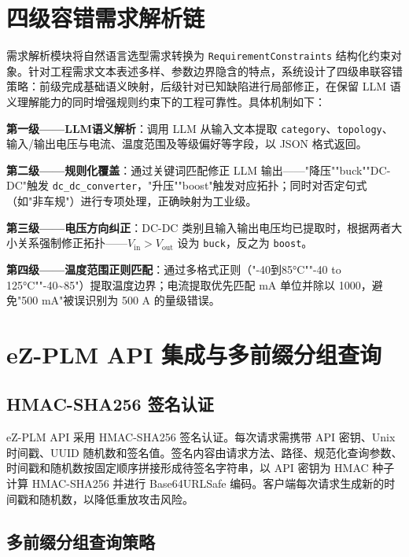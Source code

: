 
\section{四级容错需求解析链}

需求解析模块将自然语言选型需求转换为 \texttt{RequirementConstraints} 结构化约束对象。针对工程需求文本表述多样、参数边界隐含的特点，系统设计了四级串联容错策略：前级完成基础语义映射，后级针对已知缺陷进行局部修正，在保留 LLM 语义理解能力的同时增强规则约束下的工程可靠性。具体机制如下：

\textbf{第一级——LLM语义解析}：调用 LLM 从输入文本提取 \texttt{category}、\texttt{topology}、输入/输出电压与电流、温度范围及等级偏好等字段，以 JSON 格式返回。

\textbf{第二级——规则化覆盖}：通过关键词匹配修正 LLM 输出——"降压""buck""DC-DC"触发 \texttt{dc\_dc\_converter}，"升压""boost"触发对应拓扑；同时对否定句式（如"非车规"）进行专项处理，正确映射为工业级。

\textbf{第三级——电压方向纠正}：DC-DC 类别且输入输出电压均已提取时，根据两者大小关系强制修正拓扑——$V_{\text{in}} > V_{\text{out}}$ 设为 \texttt{buck}，反之为 \texttt{boost}。

\textbf{第四级——温度范围正则匹配}：通过多格式正则（"-40到85°C""-40 to 125°C""-40\textasciitilde{}85"）提取温度边界；电流提取优先匹配 mA 单位并除以 1000，避免"500 mA"被误识别为 500 A 的量级错误。


\section{eZ-PLM API 集成与多前缀分组查询}

\subsection{HMAC-SHA256 签名认证}

eZ-PLM API 采用 HMAC-SHA256 签名认证。每次请求需携带 API 密钥、Unix 时间戳、UUID 随机数和签名值。签名内容由请求方法、路径、规范化查询参数、时间戳和随机数按固定顺序拼接形成待签名字符串，以 API 密钥为 HMAC 种子计算 HMAC-SHA256 并进行 Base64URLSafe 编码。客户端每次请求生成新的时间戳和随机数，以降低重放攻击风险。

\subsection{多前缀分组查询策略}

